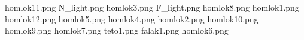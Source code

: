 homlok11.png
N_light.png
homlok3.png
F_light.png
homlok8.png
homlok1.png
homlok12.png
homlok5.png
homlok4.png
homlok2.png
homlok10.png
homlok9.png
homlok7.png
teto1.png
falak1.png
homlok6.png
